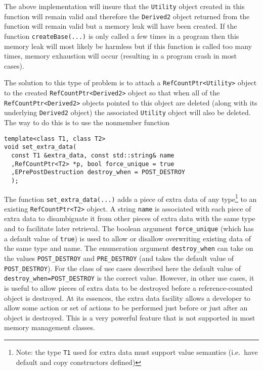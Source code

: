 {}\noindent{} The above implementation will insure that the
{}\texttt{Utility} object created in this function will remain valid
and therefore the {}\texttt{Derived2} object returned from the
function will remain valid but a memory leak will have been created.
If the function {}\texttt{create\-Base(...)}  is only called a few
times in a program then this memory leak will most likely be harmless
but if this function is called too many times, memory exhaustion will
occur (resulting in a program crash in most cases).

The solution to this type of problem is to attach a
{}\texttt{RefCountPtr<Utility>} object to the created
{}\texttt{RefCountPtr<Derived2>} object so that when all of the
{}\texttt{RefCountPtr<Derived2>} objects pointed to this object are
deleted (along with its underlying {}\texttt{Derived2} object) the
associated {}\texttt{Utility} object will also be deleted.  The way to
do this is to use the nonmember function

{\scriptsize\begin{verbatim}
template<class T1, class T2>
void set_extra_data(
  const T1 &extra_data, const std::string& name
  ,RefCountPtr<T2> *p, bool force_unique = true
  ,EPrePostDestruction destroy_when = POST_DESTROY 
  );
\end{verbatim}}

The function {}\texttt{set\-\_extra\-\_data(...)} adds a piece of
extra data of any type\footnote{Note: the type {}\texttt{T1} used for
extra data must support value semantics (i.e.~have default and copy
constructors defined)} to an existing {}\texttt{RefCountPtr<T2>}
object.  A string \texttt{name} is associated with each piece of extra
data to disambiguate it from other pieces of extra data with the same
type and to facilitate later retrieval.  The boolean argument
\texttt{force\-\_unique} (which has a default value of \texttt{true})
is used to allow or disallow overwriting existing data of the same
type and name.  The enumeration argument {}\texttt{destroy\-\_when}
can take on the values {}\texttt{POST\-\_DESTROY} and
{}\texttt{PRE\-\_DESTROY} (and takes the default value of
{}\texttt{POST\-\_DESTROY}).  For the class of use cases described
here the default value of {}\texttt{destroy\-\_when=POST\-\_DESTROY}
is the correct value.  However, in other use cases, it is useful to
allow pieces of extra data to be destroyed before a reference-counted
object is destroyed.  At its essences, the extra data facility allows
a developer to allow some action or set of actions to be performed
just before or just after an object is destroyed.  This is a very
powerful feature that is not supported in most memory management
classes.

